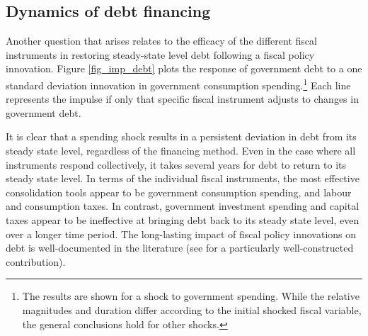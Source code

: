\documentclass[a4paper,11pt]{article}
\numberwithin{equation}{section}
\begin{document}
	\subsection{Dynamics of debt financing}
	
	Another question that arises relates to the efficacy of the different fiscal instruments in restoring steady-state level debt following a fiscal policy innovation. Figure \ref{fig_imp_debt} plots the response of government debt to a one standard deviation innovation in government consumption spending.\footnote{The results are shown for a shock to government spending. While the relative magnitudes and duration differ according to the initial shocked fiscal variable, the general conclusions hold for other shocks.} Each line represents the impulse if only that specific fiscal instrument adjusts to changes in government debt.
	
	It is clear that a spending shock results in a persistent deviation in debt from its steady state level, regardless of the financing method. Even in the case where all instruments respond collectively, it takes several years for debt to return to its steady state level. In terms of the individual fiscal instruments, the most effective consolidation tools appear to be government consumption spending, and labour and consumption taxes. In contrast, government investment spending and capital taxes appear to be ineffective at bringing debt back to its steady state level, even over a longer time period. The long-lasting impact of fiscal policy innovations on debt is well-documented in the literature (see \citealp{leeper2010} for a particularly well-constructed contribution). 
	
	\begin{minipage}{\linewidth}
		
	\end{minipage}
	
\end{document}
